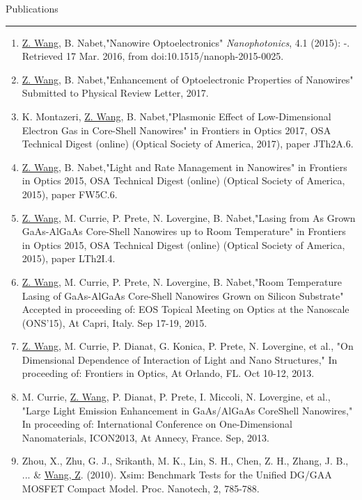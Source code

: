 \begin{vita}
{\Large\scshape\raggedright{Publications}}
\newline
\rule{\textwidth}{1pt}
\begin{enumerate}
\item \underline{Z. Wang}, B. Nabet,"Nanowire Optoelectronics" \emph{Nanophotonics}, 4.1 (2015): -. Retrieved 17 Mar. 2016, from doi:10.1515/nanoph-2015-0025.
\item \underline{Z. Wang}, B. Nabet,"Enhancement of Optoelectronic Properties of Nanowires" Submitted to Physical Review Letter, 2017.
\item K. Montazeri, \underline{Z. Wang}, B. Nabet,"Plasmonic Effect of Low-Dimensional Electron Gas in Core-Shell Nanowires" in Frontiers in Optics 2017, OSA Technical Digest (online) (Optical Society of America, 2017), paper JTh2A.6.
\item \underline{Z. Wang}, B. Nabet,"Light and Rate Management in Nanowires" in Frontiers in Optics 2015, OSA Technical Digest (online) (Optical Society of America, 2015), paper FW5C.6.
\item \underline{Z. Wang}, M. Currie,  P. Prete, N. Lovergine, B. Nabet,"Lasing from As Grown GaAs-AlGaAs Core-Shell Nanowires up to Room Temperature" in Frontiers in Optics 2015, OSA Technical Digest (online) (Optical Society of America, 2015), paper LTh2I.4.
\item \underline{Z. Wang}, M. Currie, P. Prete, N. Lovergine, B. Nabet,"Room Temperature Lasing of GaAs-AlGaAs Core-Shell Nanowires Grown on Silicon Substrate" Accepted in proceeding of:  EOS Topical Meeting on Optics at the Nanoscale  (ONS’15), At Capri, Italy. Sep 17-19, 2015.
\item \underline{Z. Wang}, M. Currie, P. Dianat, G. Konica, P. Prete, N. Lovergine, et al., "On Dimensional Dependence of Interaction of Light and Nano Structures," In proceeding of: Frontiers in Optics, At Orlando, FL. Oct 10-12, 2013.
\item M. Currie, \underline{Z. Wang}, P. Dianat, P. Prete, I. Miccoli, N. Lovergine, et al., "Large Light Emission Enhancement in GaAs/AlGaAs CoreShell Nanowires," In proceeding of: International Conference on One-Dimensional Nanomaterials, ICON2013, At Annecy, France. Sep, 2013.
\item Zhou, X., Zhu, G. J., Srikanth, M. K., Lin, S. H., Chen, Z. H., Zhang, J. B., ... \& \underline{Wang, Z}. (2010). Xsim: Benchmark Tests for the Unified DG/GAA MOSFET Compact Model. Proc. Nanotech, 2, 785-788.
\end{enumerate}


\end{vita}
